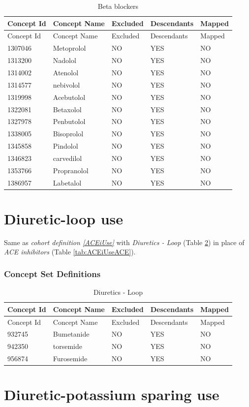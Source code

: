 \documentclass[11pt]{book}
\theoremstyle{definition}
\theoremstyle{definition}
\theoremstyle{definition}
\theoremstyle{remark}
\begin{document}
\begin{longtable}[]{@{}lllll@{}}
\caption{\label{tab:BBUseBB} Beta blockers}\tabularnewline
\toprule
Concept Id & Concept Name & Excluded & Descendants & Mapped\tabularnewline
\midrule
\endfirsthead
\toprule
Concept Id & Concept Name & Excluded & Descendants & Mapped\tabularnewline
\midrule
\endhead
1307046 & Metoprolol & NO & YES & NO\tabularnewline
1313200 & Nadolol & NO & YES & NO\tabularnewline
1314002 & Atenolol & NO & YES & NO\tabularnewline
1314577 & nebivolol & NO & YES & NO\tabularnewline
1319998 & Acebutolol & NO & YES & NO\tabularnewline
1322081 & Betaxolol & NO & YES & NO\tabularnewline
1327978 & Penbutolol & NO & YES & NO\tabularnewline
1338005 & Bisoprolol & NO & YES & NO\tabularnewline
1345858 & Pindolol & NO & YES & NO\tabularnewline
1346823 & carvedilol & NO & YES & NO\tabularnewline
1353766 & Propranolol & NO & YES & NO\tabularnewline
1386957 & Labetalol & NO & YES & NO\tabularnewline
\bottomrule
\end{longtable}

\hypertarget{DLoopUse}{%
\section{Diuretic-loop use}\label{DLoopUse}}

Same as \emph{cohort definition \ref{ACEiUse}} with \emph{Diuretics - Loop} (Table \ref{tab:DLoopUseDLoops}) in place of \emph{ACE inhibitors} (Table \ref{tab:ACEiUseACE}).

\hypertarget{concept-set-definitions-12}{%
\subsubsection*{Concept Set Definitions}\label{concept-set-definitions-12}}

\begin{longtable}[]{@{}lllll@{}}
\caption{\label{tab:DLoopUseDLoops} Diuretics - Loop}\tabularnewline
\toprule
Concept Id & Concept Name & Excluded & Descendants & Mapped\tabularnewline
\midrule
\endfirsthead
\toprule
Concept Id & Concept Name & Excluded & Descendants & Mapped\tabularnewline
\midrule
\endhead
932745 & Bumetanide & NO & YES & NO\tabularnewline
942350 & torsemide & NO & YES & NO\tabularnewline
956874 & Furosemide & NO & YES & NO\tabularnewline
\bottomrule
\end{longtable}

\hypertarget{DPUse}{%
\section{Diuretic-potassium sparing use}\label{DPUse}}
\end{document}

